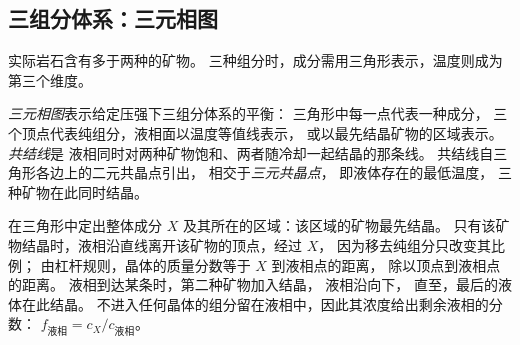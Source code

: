 \subsection*{三组分体系：三元相图}

实际岩石含有多于两种的矿物。
三种组分时，成分需用三角形表示，温度则成为第三个维度。

\begin{definition}\label{def:b2:mantle-melting:ternary}
\emph{三元相图}表示给定压强下三组分体系的平衡：
三角形中每一点代表一种成分，
三个顶点代表纯组分，液相面以温度等值线表示，
或以最先结晶矿物的区域表示。
\emph{共结线}是
液相同时对两种矿物饱和、两者随冷却一起结晶的那条线。
共结线自三角形各边上的二元共晶点引出，
相交于\emph{三元共晶点}，
即液体存在的最低温度，
三种矿物在此同时结晶。
\end{definition}

\begin{method}[在三元相图上读取结晶路径]\label{met:b2:mantle-melting:ternary}
在三角形中定出整体成分 $X$ 及其所在的区域：该区域的矿物最先结晶。
只有该矿物结晶时，液相沿直线离开该矿物的顶点，经过 $X$，
因为移去纯组分只改变其比例；
由杠杆规则，晶体的质量分数等于 $X$ 到液相点的距离，
除以顶点到液相点的距离。
液相到达某条时，第二种矿物加入结晶，
液相沿向下，
直至，最后的液体在此结晶。
不进入任何晶体的组分留在液相中，因此其浓度给出剩余液相的分数：
$f_{\text{液相}} = c_X/c_{\text{液相}}$。
\end{method}

